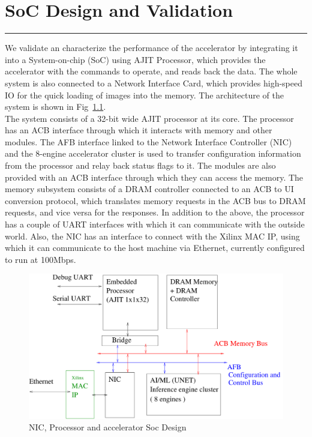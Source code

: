 \documentclass[12pt]{report}
\begin{document}
\newpage
\chapter{SoC Design and Validation} \label{3}
\rule[10pt]{\linewidth}{3pt}
We validate an characterize the performance of the accelerator by integrating it into a System-on-chip (SoC) using AJIT Processor, which provides the accelerator with the commands to operate, and reads back the data. The whole system is also connected to a Network Interface Card, which provides high-speed IO for the quick loading of images into the memory. The architecture of the system is shown in Fig~\ref{fig:SoC}.
\\

The system consists of a 32-bit wide AJIT processor at its core. The processor has an ACB interface through which it interacts with memory and other modules. The AFB interface linked to the Network Interface Controller (NIC) and the 8-engine accelerator cluster is used to transfer configuration information from the processor and relay back status flags to it. The modules are also provided with an ACB interface through which they can access the memory. The memory subsystem consists of a DRAM controller connected to an ACB to UI conversion protocol, which translates memory requests in the ACB bus to DRAM requests, and vice versa for the responses. In addition to the above, the processor has a couple of UART interfaces with which it can communicate with the outside world. Also, the NIC has an interface to connect with the Xilinx MAC IP, using which it can communicate to the host machine via Ethernet, currently configured to run at 100Mbps. 
\\


		\begin{figure}[htbp]
			\centering
			\includegraphics[width=12cm]{./figures/BlockDiagram.pdf}
			\caption{NIC, Processor and accelerator Soc Design}
			\label{fig:SoC}
		\end{figure}
\end{document}
